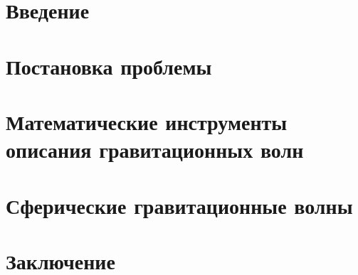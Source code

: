 \documentclass[12pt,a4paper,final]{article}
\providecommand{\docroot}{../..}
\numberwithin{equation}{section}
\begin{document}
    \makedocroot

    
    \tableofcontents

    \newpage

    \section{Введение}
    

    \section{Постановка проблемы}
    

    \section{Математические инструменты описания гравитационных волн}
    

    \section{Сферические гравитационные волны}
    

    \section{Заключение}
    

    \clearpage

    
    
\end{document}
